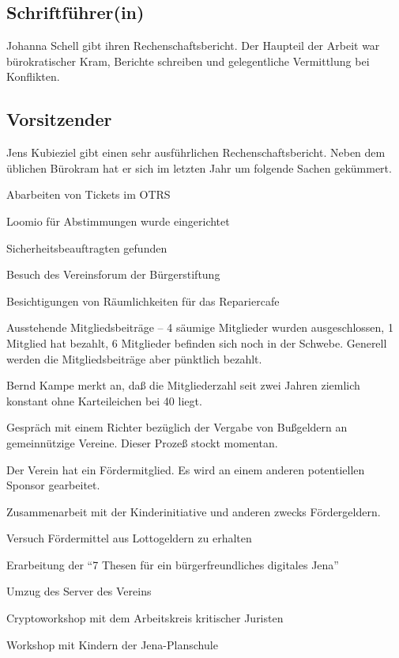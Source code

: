 \documentclass[]{scrartcl}
\newenvironment{packed_item}{
\begin{itemize}
\setlength{\itemsep}{-5pt}
\setlength{\parsep}{0pt}
}{\end{itemize}}
\newcommand{\qbi}{Jens Kubieziel}
\newcommand{\berndf}{Bernd Kampe}
\newcommand{\hanna}{Johanna Schell}
\begin{document}
\begin{multicols}{2}
\subsection{Schriftführer(in)}
\hanna{} gibt ihren Rechenschaftsbericht. Der Haupteil der Arbeit war
bürokratischer Kram, Berichte schreiben und gelegentliche Vermittlung bei
Konflikten.

\subsection{Vorsitzender}
\qbi{} gibt einen sehr ausführlichen Rechenschaftsbericht. Neben dem üblichen
Bürokram hat er sich im letzten Jahr um folgende Sachen gekümmert.
\begin{packed_item}
\item Abarbeiten von Tickets im OTRS
\item Loomio für Abstimmungen wurde eingerichtet
\item Sicherheitsbeauftragten gefunden
\item Besuch des Vereinsforum der Bürgerstiftung
\item Besichtigungen von Räumlichkeiten für das Repariercafe
\item Ausstehende Mitgliedsbeiträge -- 4 säumige Mitglieder wurden
ausgeschlossen, 1 Mitglied hat bezahlt, 6 Mitglieder befinden sich noch in
der Schwebe. Generell werden die Mitgliedsbeiträge aber pünktlich bezahlt.
\end{packed_item}
\berndf{} merkt an, daß die Mitgliederzahl seit zwei Jahren ziemlich
konstant ohne Karteileichen bei 40 liegt.
\begin{packed_item}
\item Gespräch mit einem Richter bezüglich der Vergabe von Bußgeldern an
gemeinnützige Vereine. Dieser Prozeß stockt momentan.
\item Der Verein hat ein Fördermitglied. Es wird an einem anderen
potentiellen Sponsor gearbeitet.
\item Zusammenarbeit mit der Kinderinitiative und anderen zwecks
Fördergeldern.
\item Versuch Fördermittel aus Lottogeldern zu erhalten
\item Erarbeitung der \enquote{7 Thesen für ein bürgerfreundliches digitales Jena}
\item Umzug des Server des Vereins
\item Cryptoworkshop mit dem Arbeitskreis kritischer Juristen
\item Workshop mit Kindern der Jena-Planschule
\end{packed_item}


\end{multicols}
\end{document}
